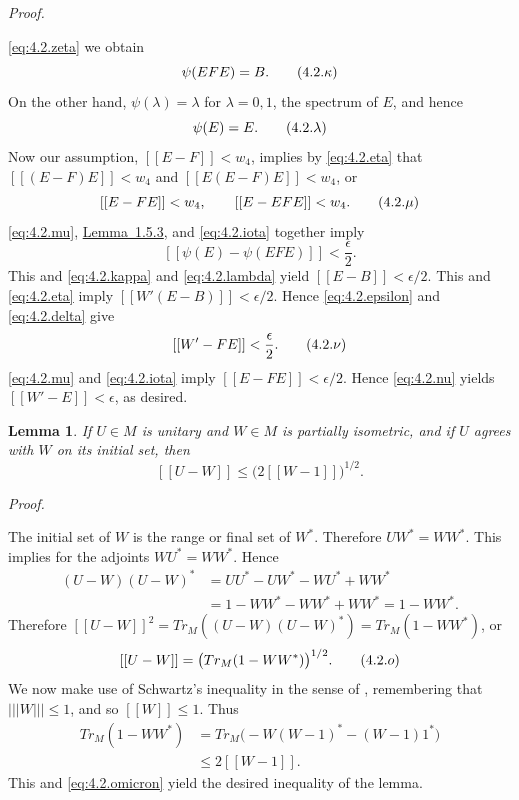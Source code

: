 \documentclass[b5paper,twoside]{article}
\newcommand{\lemref}[2]{\hyperref[#1]{\mbox{Lemma~#2}}}
\theoremstyle{mvnplain}
\newtheorem{lemma}{Lemma}[section]
\renewenvironment{proof}[1][Proof]{%
  \par\addvspace{0.35\baselineskip}%
  \noindent\textit{#1.}\ \normalfont\ignorespaces
}{%
  \par\addvspace{0.35\baselineskip}%
}
\newcommand{\M}{\mathbf M}
\newcommand{\Metric}[1]{\left[\!\left[#1\right]\!\right]}
\newcommand{\OpNorm}[1]{\left\lvert\left\lvert\left\lvert#1\right\rvert\right\rvert\right\rvert}
\def\M{M}%
\def\Metric#1{[[#1]]}%
\def\operatorname#1{#1}%
\begin{document}
\begin{proof}
\eqref{eq:4.2.zeta} we obtain
\begin{equation}\label{eq:4.2.kappa}
  \psi(EFE)=B.
  \tag{4.2.\ensuremath{\kappa}}
\end{equation}
On the other hand, \(\psi(\lambda)=\lambda\) for \(\lambda=0,1\), the
spectrum of \(E\), and hence
\begin{equation}\label{eq:4.2.lambda}
  \psi(E)=E.
  \tag{4.2.\ensuremath{\lambda}}
\end{equation}
Now our assumption, \(\Metric{E-F}<w_4\), implies by
\eqref{eq:4.2.eta} that \(\Metric{(E-F)E}<w_4\) and
\(\Metric{E(E-F)E}<w_4\), or
\begin{equation}\label{eq:4.2.mu}
 \Metric{E-FE}<w_4,\qquad \Metric{E-EFE}<w_4.
  \tag{4.2.\ensuremath{\mu}}
\end{equation}
\eqref{eq:4.2.mu}, \lemref{lem:1.5.3}{1.5.3}, and
\eqref{eq:4.2.iota} together imply
\[
  \Metric{\psi(E)-\psi(EFE)}<\frac{\epsilon}{2}.
\]
This and \eqref{eq:4.2.kappa} and \eqref{eq:4.2.lambda} yield
\(\Metric{E-B}<\epsilon/2\). This and \eqref{eq:4.2.eta} imply
\(\Metric{W'(E-B)}<\epsilon/2\). Hence \eqref{eq:4.2.epsilon} and
\eqref{eq:4.2.delta} give
\begin{equation}\label{eq:4.2.nu}
  \Metric{W'-FE}<\frac{\epsilon}{2}.
  \tag{4.2.\ensuremath{\nu}}
\end{equation}
\eqref{eq:4.2.mu} and \eqref{eq:4.2.iota} imply
\(\Metric{E-FE}<\epsilon/2\). Hence \eqref{eq:4.2.nu} yields
\(\Metric{W'-E}<\epsilon\), as desired.
\end{proof}

\begin{lemma}\label{lem:4.2.3}
If \(U\in\M\) is unitary and \(W\in\M\) is partially isometric, and if
\(U\) agrees with \(W\) on its initial set, then
\[
  \Metric{U-W}\le\bigl(2\Metric{W-1}\bigr)^{1/2}.
\]
\end{lemma}

\begin{proof}
The initial set of \(W\) is the range or final set of \(W^*\). Therefore
\(UW^*=WW^*\). This implies for the adjoints \(WU^*=WW^*\). Hence
\[
\begin{aligned}
(U-W)(U-W)^*
 &=UU^*-UW^*-WU^*+WW^*\\
 &=1-WW^*-WW^*+WW^*=1-WW^*.
\end{aligned}
\]
Therefore
\(\Metric{U-W}^2
=\operatorname {Tr}_{\M}((U-W)(U-W)^*)
=\operatorname {Tr}_{\M}(1-WW^*)\), or
\begin{equation}\label{eq:4.2.omicron}
  \Metric{U-W}=\bigl(\operatorname {Tr}_{\M}(1-WW^*)\bigr)^{1/2}.
  \tag{4.2.\ensuremath{o}}
\end{equation}
We now make use of Schwartz's inequality in the sense of
\cite[p.~241, Theorem~VIII]{ref6}, remembering that \(\OpNorm{W}\le1\), and
so \(\Metric{W}\le1\). Thus
\[
\begin{aligned}
\operatorname {Tr}_{\M}(1-WW^*)
 &=\operatorname {Tr}_{\M}\bigl(-W(W-1)^*-(W-1)1^*\bigr)\\
 &\le2\Metric{W-1}.
\end{aligned}
\]
This and \eqref{eq:4.2.omicron} yield the desired inequality of the lemma.
\end{proof}
\end{document}
